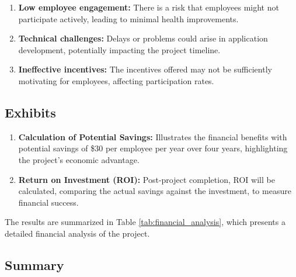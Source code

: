 \begin{enumerate}
    \item \textbf{Low employee engagement:} There is a risk that employees might not participate actively, leading to minimal health improvements.
    \item \textbf{Technical challenges:} Delays or problems could arise in application development, potentially impacting the project timeline.
    \item \textbf{Ineffective incentives:} The incentives offered may not be sufficiently motivating for employees, affecting participation rates.
\end{enumerate}

\subsection{Exhibits}

\begin{enumerate}
    \item \textbf{Calculation of Potential Savings:} Illustrates the financial benefits with potential savings of \$30 per employee per year over four years, highlighting the project's economic advantage.
    \item \textbf{Return on Investment (ROI):} Post-project completion, ROI will be calculated, comparing the actual savings against the investment, to measure financial success.
\end{enumerate}

    
The results are summarized in Table \ref{tab:financial_analysis}, which presents a detailed financial analysis of the project.


\subsection{Summary}

